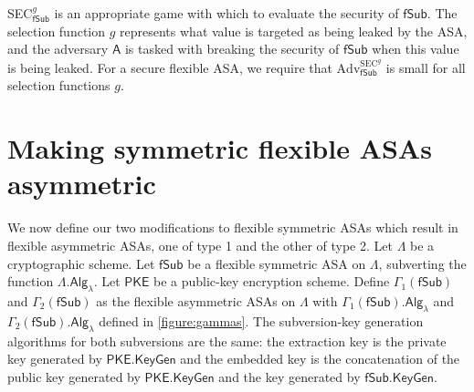 SEC$^g_\mathsf{fSub}$ is an appropriate game with which to evaluate the security of $\mathsf{fSub}$. The selection function $g$ represents what value is targeted as being leaked by the ASA, and the adversary $\mathsf{A}$ is tasked with breaking the security of $\mathsf{fSub}$ when this value is being leaked. For a secure flexible ASA, we require that $\mathrm{Adv}^{\mathrm{SEC}^g}_\mathsf{fSub}$ is small for all selection functions $g$.

\section{Making symmetric flexible ASAs asymmetric}
We now define our two modifications to flexible symmetric ASAs which result in flexible asymmetric ASAs, one of type 1 and the other of type 2. Let $\mathsf{\Lambda}$ be a cryptographic scheme. Let $\mathsf{fSub}$ be a flexible symmetric ASA on $\mathsf{\Lambda}$, subverting the function $\mathsf{\Lambda.Alg}_\lambda$. Let $\mathsf{PKE}$ be a public-key encryption scheme. Define $\Gamma_1(\mathsf{fSub})$ and $\Gamma_2(\mathsf{fSub})$ as the flexible asymmetric ASAs on $\mathsf{\Lambda}$ with $\Gamma_1(\mathsf{fSub}).\mathsf{Alg}_\lambda$ and $\Gamma_2(\mathsf{fSub}).\mathsf{Alg}_\lambda$ defined in \autoref{figure:gammas}. The subversion-key generation algorithms for both subversions are the same: the extraction key is the private key generated by $\mathsf{PKE.KeyGen}$ and the embedded key is the concatenation of the public key generated by $\mathsf{PKE.KeyGen}$ and the key generated by $\mathsf{fSub.KeyGen}$.

